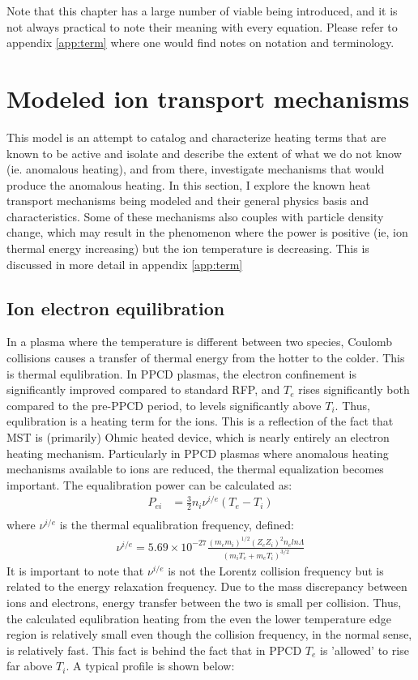 \begin{refsection}
Note that this chapter has a large number of viable being introduced, and it is not always practical to note their meaning with every equation. Please refer to appendix \ref{app:term} where one would find notes on notation and terminology. 

\section{Modeled ion transport mechanisms}
This model is an attempt to catalog and characterize heating terms that are known to be active and isolate and describe the extent of what we do not know (ie. anomalous heating), and from there, investigate mechanisms that would produce the anomalous heating. In this section, I explore the known heat transport mechanisms being modeled and their general physics basis and characteristics. Some of these mechanisms also couples with particle density change, which may result in the phenomenon where the power is positive (ie, ion thermal energy increasing) but the ion temperature is decreasing. This is discussed in more detail in appendix \ref{app:term}

\subsection{Ion electron equilibration}

In a plasma where the temperature is different between two species, Coulomb collisions causes a transfer of thermal energy from the hotter to the colder. This is thermal equlibration. In PPCD plasmas, the electron confinement is significantly improved compared to standard RFP, and $T_e$ rises significantly both compared to the pre-PPCD period, to levels significantly above $T_i$. Thus, equlibration is a heating term for the ions. This is a reflection of the fact that MST is (primarily) Ohmic heated device, which is nearly entirely an electron heating mechanism. Particularly in PPCD plasmas where anomalous heating mechanisms available to ions are reduced, the thermal equalization becomes important. The equalibration power can be calculated as:
\begin{align}
    P_{ei} &= \frac{3}{2}n_i\nu^{i/e}(T_e - T_i)\\
\end{align}
where $\nu^{i/e}$ is the thermal equalibration frequency, defined:
\begin{align}
    \nu^{i/e} = 5.69\times10^{-27}\frac{(m_e m_i)^{1/2}(Z_e Z_i)^{2} n_e ln \Lambda}{(m_iT_e + m_eT_i)^{3/2}}
\end{align}
It is important to note that $\nu^{i/e}$ is not the Lorentz collision frequency but is related to the energy relaxation frequency. Due to the mass discrepancy between ions and electrons, energy transfer between the two is small per collision. Thus, the calculated equlibration heating from the even the lower temperature edge region is relatively small even though the collision frequency, in the normal sense, is relatively fast. This fact is behind the fact that in PPCD $T_e$ is 'allowed' to rise far above $T_i$. A typical profile is shown below:


\end{refsection}
